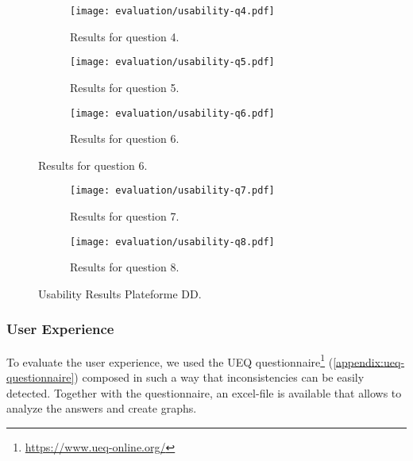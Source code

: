 \begin{figure}\ContinuedFloat
	\centering
	\begin{subfigure}{.8\textwidth}
  		\centering
  		\texttt{[image: evaluation/usability-q4.pdf]}
  		\caption{Results for question 4.}
	\end{subfigure}\par\bigskip
	
	\begin{subfigure}{.8\textwidth}
  		\centering
  		\texttt{[image: evaluation/usability-q5.pdf]}
  		\caption{Results for question 5.}
	\end{subfigure}\par\bigskip
	
	\begin{subfigure}{.8\textwidth}
  		\centering
  		\texttt{[image: evaluation/usability-q6.pdf]}
  		\caption{Results for question 6.}
	\end{subfigure}
\end{figure}

\begin{figure}\ContinuedFloat
	\centering
	\begin{subfigure}{.8\textwidth}
  		\centering
  		\texttt{[image: evaluation/usability-q7.pdf]}
  		\caption{Results for question 7.}
	\end{subfigure}\par\bigskip
	
	\begin{subfigure}{.8\textwidth}
  		\centering
  		\texttt{[image: evaluation/usability-q8.pdf]}
  		\caption{Results for question 8.}
	\end{subfigure}
	\caption{Usability Results Plateforme DD.}
	\label{fig:evaluation-pdd-usability}
\end{figure}


\subsubsection{User Experience}
To evaluate the user experience, we used the UEQ questionnaire\footnote{\url{https://www.ueq-online.org/}} (\autoref{appendix:ueq-questionnaire}) composed in such a way that inconsistencies can be easily detected. Together with the questionnaire, an excel-file is available that allows to analyze the answers and create graphs.\\

